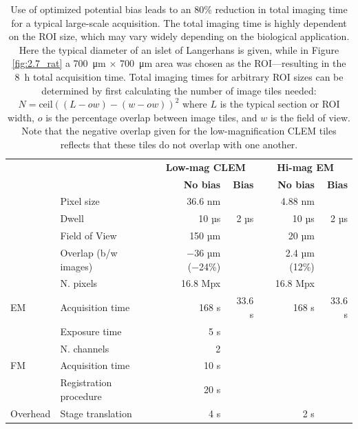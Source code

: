 \begin{table}[!tb]
    \centering
    \caption{Use of optimized potential bias leads to an 80\% reduction in total imaging time for a typical large-scale acquisition. The total imaging time is highly dependent on the ROI size, which may vary widely depending on the biological application. Here the typical diameter of an islet of Langerhans is given, while in Figure \ref{fig:2.7_rat} a \SI{700}{\micro\meter} $\times$ \SI{700}{\micro\meter} area was chosen as the ROI—resulting in the \SI{8}{\hour} total acquisition time. Total imaging times for arbitrary ROI sizes can be determined by first calculating the number of image tiles needed: $N=\text{ceil}\left((L-ow) - (w-ow)\right)^2$ where $L$ is the typical section or ROI width, $o$ is the percentage overlap between image tiles, and $w$ is the field of view. Note that the negative overlap given for the low-magnification CLEM tiles reflects that these tiles do not overlap with one another.}
    \footnotesize
    \begin{tabular}{@{}p{15mm}p{30mm}rrrr@{}}
    \toprule
    \multicolumn{1}{r}{} & \multicolumn{1}{r}{} & \multicolumn{2}{c}{\textbf{Low-mag CLEM}} & \multicolumn{2}{c}{\textbf{Hi-mag EM}} \\
     \arrayrulecolor{black!30}\cmidrule(l){3-4} \cmidrule(l){5-6}
     &  & \textbf{No bias} & \textbf{Bias} & \textbf{No bias} & \textbf{Bias} \\
     \arrayrulecolor{black!30}\midrule
     & Pixel size & 36.6 nm &  & 4.88 nm &  \\
     & Dwell & 10 µs & 2 µs & 10 µs & 2 µs \\
     & Field of View & 150 µm &  & 20 µm &  \\
     & Overlap (b/w images) & −36 µm (−24\%) &  & 2.4 µm (12\%) &  \\
     & N. pixels & 16.8 Mpx &  & 16.8 Mpx &  \\
    \multirow{-6}{*}{EM} & Acquisition time & 168 s & 33.6 s & 168 s & 33.6 s \\
    \arrayrulecolor{black!30}\midrule
     & Exposure time & 5 s &  &  &  \\
     & N. channels & 2 &  &  &  \\
    \multirow{-3}{*}{FM} & Acquisition time & 10 s &  &  &  \\
    \arrayrulecolor{black!30}\midrule
     & Registration procedure & 20 s &  &  &  \\
    \multirow{-2}{*}{Overhead} & Stage translation & 4 s &  & 2 s &  \\

\end{tabular}
\end{table}
